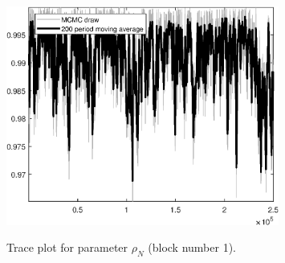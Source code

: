 \begin{figure}[H]
\centering
  \includegraphics[width=0.8\textwidth]{BRS_fd/graphs/TracePlot_rho_N_blck_1}\\
    \caption{Trace plot for parameter ${\rho_N}$ (block number 1).}
\end{figure}
